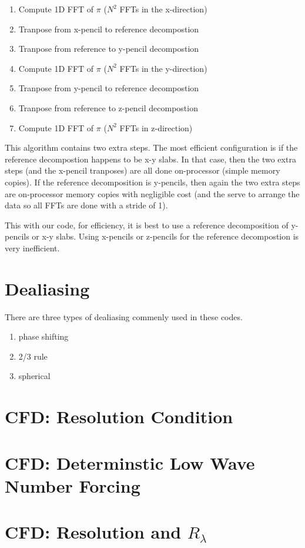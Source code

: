 \documentclass[12pt]{article}
\begin{document}
\begin{enumerate}
\item Compute 1D FFT of $\pi$ ($N^2$ FFTs in the x-direction)
\item Tranpose from x-pencil to reference decompostion
\item Tranpose from reference to y-pencil decompostion
\item Compute 1D FFT of $\pi$ ($N^2$ FFTs in the y-direction)
\item Tranpose from y-pencil to reference decompostion
\item Tranpose from reference to z-pencil decompostion
\item Compute 1D FFT of $\pi$ ($N^2$ FFTs in z-direction)
\end{enumerate}

This algorithm contains two extra steps.  The most efficient
configuration is if the reference decompostion happens to be x-y slabs.
In that case, then the two extra steps (and the x-pencil tranposes)
are all done on-processor (simple memory copies).
If the reference decomposition is y-pencils, then again the
two extra steps are on-processor memory copies with
negligible cost (and the serve to arrange the data so all
FFTs are done with a stride of 1).

This with our code, for efficiency, it is best to use a reference 
decomposition of y-pencils or x-y slabs.  Using x-pencils or z-pencils 
for the reference decompostion is very inefficient.  


\section{Dealiasing}

There are three types of dealiasing commenly used in these codes.
\begin{enumerate}
\item phase shifting
\item 2/3 rule
\item spherical
\end{enumerate}

\section{CFD: Resolution Condition}

\section{CFD: Determinstic Low Wave Number Forcing}

\section{CFD: Resolution and $R_\lambda$}
\end{document}
